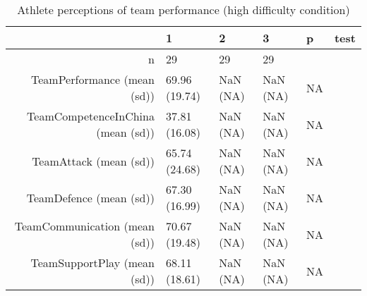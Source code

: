 \begin{table}[ht]
\centering
\begin{tabular}{rlllll}
  \hline
 & 1 & 2 & 3 & p & test \\ 
  \hline
n &    29 &  29 &  29 &  &  \\ 
  TeamPerformance (mean (sd)) & 69.96 (19.74) & NaN (NA) & NaN (NA) &  NA &  \\ 
  TeamCompetenceInChina (mean (sd)) & 37.81 (16.08) & NaN (NA) & NaN (NA) &  NA &  \\ 
  TeamAttack (mean (sd)) & 65.74 (24.68) & NaN (NA) & NaN (NA) &  NA &  \\ 
  TeamDefence (mean (sd)) & 67.30 (16.99) & NaN (NA) & NaN (NA) &  NA &  \\ 
  TeamCommunication (mean (sd)) & 70.67 (19.48) & NaN (NA) & NaN (NA) &  NA &  \\ 
  TeamSupportPlay (mean (sd)) & 68.11 (18.61) & NaN (NA) & NaN (NA) &  NA &  \\ 
   \hline
\end{tabular}
\caption{Athlete perceptions of 
 team performance (high difficulty condition)} 
\label{tab:teamPerfTimeLowTraining}
\end{table}
